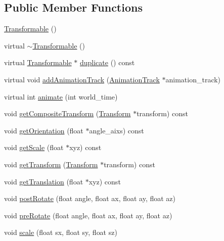 \subsection*{Public Member Functions}
\begin{CompactItemize}
\item 
\hyperlink{classm3g_1_1Transformable_ca6563203e3e883391c9d0927028aa04}{Transformable} ()
\item 
virtual \hyperlink{classm3g_1_1Transformable_89d9c7912ed11a30a312fd8f72b9ab22}{$\sim$Transformable} ()
\item 
virtual \hyperlink{classm3g_1_1Transformable}{Transformable} $\ast$ \hyperlink{classm3g_1_1Transformable_4f64f95a34c56cb1553dc6de660dff6f}{duplicate} () const 
\item 
virtual void \hyperlink{classm3g_1_1Transformable_415c0b110f95410ded9b85e5d99a496b}{addAnimationTrack} (\hyperlink{classm3g_1_1AnimationTrack}{AnimationTrack} $\ast$animation\_\-track)
\item 
virtual int \hyperlink{classm3g_1_1Transformable_8aad1ceab4c2a03609c8a42324ce484d}{animate} (int world\_\-time)
\item 
void \hyperlink{classm3g_1_1Transformable_263ef66efed11b7f9678e2e4bbec4c55}{getCompositeTransform} (\hyperlink{classm3g_1_1Transform}{Transform} $\ast$transform) const 
\item 
void \hyperlink{classm3g_1_1Transformable_06125ab0d85ef8c5c7ace9ced04993f3}{getOrientation} (float $\ast$angle\_\-aixs) const 
\item 
void \hyperlink{classm3g_1_1Transformable_b8a2dd11d0ba90e138625eb86a6a6083}{getScale} (float $\ast$xyz) const 
\item 
void \hyperlink{classm3g_1_1Transformable_73f387f99c527b382c8aaa54b8af6ed6}{getTransform} (\hyperlink{classm3g_1_1Transform}{Transform} $\ast$transform) const 
\item 
void \hyperlink{classm3g_1_1Transformable_d8aec42959fecc3d76f9539d3afa3c8d}{getTranslation} (float $\ast$xyz) const 
\item 
void \hyperlink{classm3g_1_1Transformable_4abf135257f132cdf9580f3a3e11ea6c}{postRotate} (float angle, float ax, float ay, float az)
\item 
void \hyperlink{classm3g_1_1Transformable_718b606184672eec83263ad44d5c7431}{preRotate} (float angle, float ax, float ay, float az)
\item 
void \hyperlink{classm3g_1_1Transformable_d94deaf828db5e2dfd5e40db42b64cd9}{scale} (float sx, float sy, float sz)
\item 

\end{CompactItemize}
